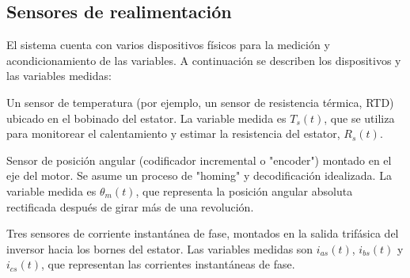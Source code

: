 \documentclass{article}
\begin{document}
\subsection{Sensores de realimentación}

El sistema cuenta con varios dispositivos físicos para la medición y acondicionamiento de las variables. A 
continuación se describen los dispositivos y las variables medidas:

Un sensor de temperatura (por ejemplo, un sensor de resistencia térmica, RTD) ubicado en el bobinado del 
estator. La variable medida es $T_s(t)$, que se utiliza para monitorear el calentamiento y estimar la 
resistencia del estator, $R_s(t)$.

Sensor de posición angular (codificador incremental o "encoder") montado en el eje del motor. Se asume un 
proceso de "homing" y decodificación idealizada. La variable medida es $\theta_m(t)$, que representa la posición 
angular absoluta rectificada después de girar más de una revolución. 

  
Tres sensores de corriente instantánea de fase, montados en la salida trifásica del inversor hacia los 
bornes del estator. Las variables medidas son $i_{as}(t)$, $i_{bs}(t)$ y $i_{cs}(t)$, que representan las corrientes 
instantáneas de fase.
\end{document}
